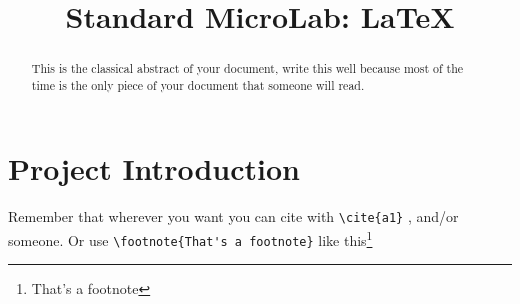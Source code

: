 \documentclass[a4paper,12pt]{article}
\begin{document}
\title{Standard MicroLab: \LaTeX }
\providecommand{\annoacc}{20XY}

\titlfp


\newpage

\tableofcontents

\newpage

\listoffigures



\headsep 2cm
\hoffset -1cm
\textwidth 15cm
\setlength{\headwidth}{\textwidth}


\newpage

\begin{abstract}
This is the classical abstract of your document, write this well because most of the time is the only piece of your document that someone will read.
\end{abstract}


\newpage

\section{Project Introduction}\label{sec:i}
Remember that wherever you want you can cite with \verb.\cite{a1}. \cite{a1}, \cite{b1} and/or \cite{m1} someone.
Or use \verb.\footnote{That's a footnote}. like this\footnote{That's a footnote} 

\end{document}
